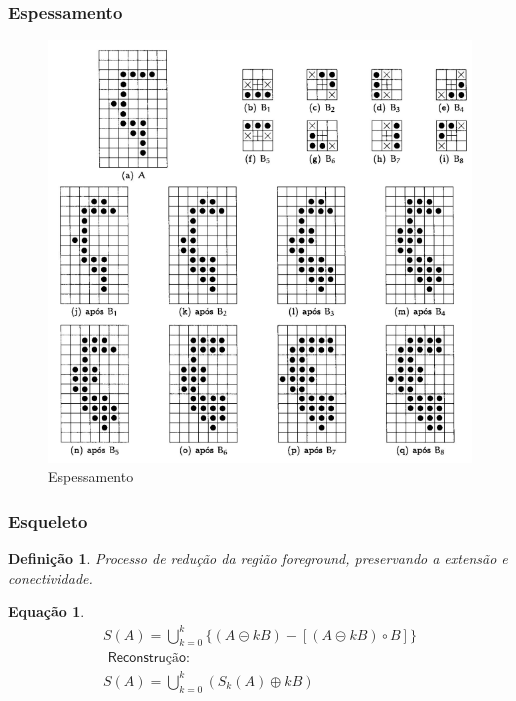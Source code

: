 \documentclass[aspectratio=169]{beamer}
\theoremstyle{Definition}
\newtheorem{defn}{Defini\c c\~ao}
\newtheorem{eq}[theorem]{Equa\c c\~ao}
\begin{document}
\begin{frame}
	\frametitle{Espessamento}
	
	\begin{figure}[h]
	 	\includegraphics[width=0.6\paperwidth,height=0.6\paperheight]{imagens/espessamento}
		\caption{Espessamento}\label{figThinkess}
	\end{figure}
	
\end{frame}

\begin{frame}
	\frametitle{Esqueleto}
	
	\begin{defn}
		Processo de redução da região foreground, preservando a extensão e conectividade.
	\end{defn}
	
	\begin{eq}
		\begin{align*}
				S(A) = \bigcup^k_{k=0} \{ (A \circleddash kB) - [(A \circleddash kB) \circ B] \} \\
				\textsf{ Reconstrução}: \\
				S(A) = \bigcup^k_{k=0} (S_k(A) \oplus kB)
		\end{align*}
	
	\end{eq}
		
\end{frame}
\end{document}
